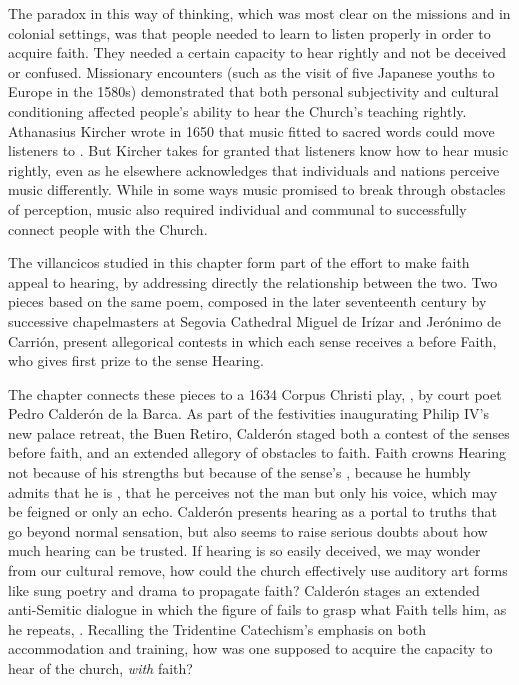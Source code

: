 \documentclass[tt]{vcbook-proposal}
\begin{document}
The paradox in this way of thinking, which was most clear on the missions and in colonial settings, was that people needed to learn to listen properly in order to acquire faith.
They needed a certain capacity to hear rightly and not be deceived or confused.
Missionary encounters (such as the visit of five Japanese youths to Europe in the 1580s) demonstrated that both personal subjectivity and cultural conditioning affected people's ability to hear the Church's teaching rightly.
Athanasius Kircher wrote in 1650 that music fitted to sacred words could move listeners to .
But Kircher takes for granted that listeners know how to hear music rightly, even as he elsewhere acknowledges that individuals and nations perceive music differently.
While in some ways music promised to break through obstacles of perception, music also required individual and communal  to successfully connect people with the Church.

The villancicos studied in this chapter form part of the effort to make faith appeal to hearing, by addressing directly the relationship between the two.
Two pieces based on the same poem, composed in the later seventeenth century by successive chapelmasters at Segovia Cathedral Miguel de Irízar and Jerónimo de Carrión, present allegorical contests in which each sense receives a  before Faith, who gives first prize to the sense Hearing.

The chapter connects these pieces to a 1634 Corpus Christi play, , by court poet Pedro Calderón de la Barca.
As part of the festivities inaugurating Philip IV's new palace retreat, the Buen Retiro, Calderón staged both a contest of the senses before faith, and an extended allegory of obstacles to faith.
Faith crowns Hearing not because of his strengths but because of the sense's , because he humbly admits that he is , that he perceives not the man but only his voice, which may be feigned or only an echo.
Calderón presents hearing as a portal to truths that go beyond normal sensation, but also seems to raise serious doubts about how much hearing can be trusted.
If hearing is so easily deceived, we may wonder from our cultural remove, how could the church effectively use auditory art forms like sung poetry and drama to propagate faith?
Calderón stages an extended anti-Semitic dialogue in which the figure of  fails to grasp what Faith tells him, as he repeats, .
Recalling the Tridentine Catechism's emphasis on both accommodation and training, how was one supposed to acquire the capacity to hear  of the church, \emph{with} faith?
\end{document}
